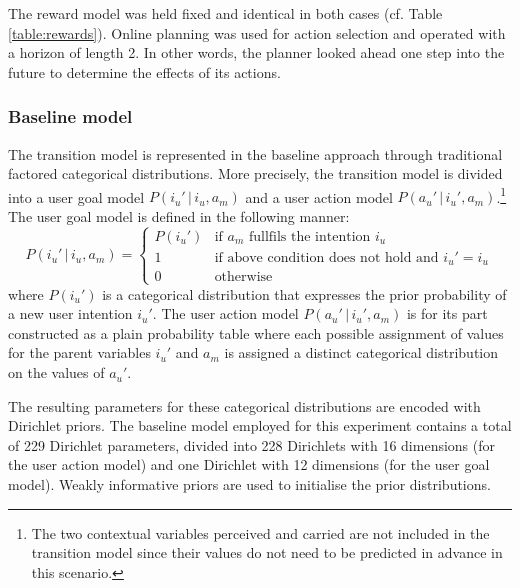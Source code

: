 The reward model was held fixed and identical in both cases (cf. Table \ref{table:rewards}). Online planning was used for action selection and operated with a horizon of length 2. In other words, the planner looked ahead one step into the future to determine the effects of its actions.  




\subsubsection*{Baseline model}

The transition model is represented in the baseline approach through traditional factored categorical distributions. More precisely, the transition model is divided into a user goal model $P(i_u'\, | \, i_u, a_m)$ and a user action model $P(a_u' \, | \, i_u',a_m)$.\footnote{The two contextual variables $\mathrm{perceived}$ and $\mathrm{carried}$ are not included in the transition model since their values do not need to be predicted in advance in this scenario.} The user goal model is defined in the following manner:
\begin{equation}
P(i_u' \, | \, i_u, a_m) = \begin{cases}
P(i_u') & \text{if } a_m \text{ fullfils the intention } i_u \\
1 & \text{if above condition does not hold and } i_u' = i_u \\
0 & \text{otherwise} \end{cases} \nonumber
\end{equation}
where $P(i_u')$ is a categorical distribution that expresses the prior probability of a new user intention $i_u'$. The user action model $P(a_u' \, | \, i_u',a_m)$ is for its part constructed as a plain probability table where each possible assignment of values for the parent variables $i_u'$ and $a_m$ is assigned a distinct categorical distribution on the values of $a_u'$. 

The resulting parameters for these categorical distributions are encoded with Dirichlet priors.  The baseline model employed for this experiment contains a total of 229 Dirichlet parameters, divided into 228 Dirichlets with 16 dimensions (for the user action model) and one Dirichlet with 12 dimensions (for the user goal model).  Weakly informative priors are used to initialise the prior distributions.

